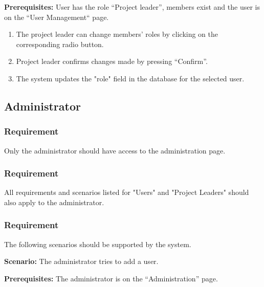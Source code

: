 \documentclass{article}
\begin{document}
\textbf{Prerequisites:} User has the role “Project leader”, members exist and the user is on the “User Management“ page.

\begin{enumerate}
    \item The project leader can change members' roles by clicking on the corresponding radio button.
    \item Project leader confirms changes made by pressing “Confirm”.
    \item The system updates the "role" field in the database for the selected user.
    
\end{enumerate}


\subsection{Administrator}


\subsubsection{Requirement}
Only the administrator should have access to the administration page.

\subsubsection{Requirement}
All requirements and scenarios listed for "Users" and "Project Leaders" should also apply to the administrator.

\subsubsection{Requirement}
The following scenarios should be supported by the system.

\textbf{Scenario:} The administrator tries to add a user.

\textbf{Prerequisites:} The administrator is on the “Administration” page.
\end{document}
